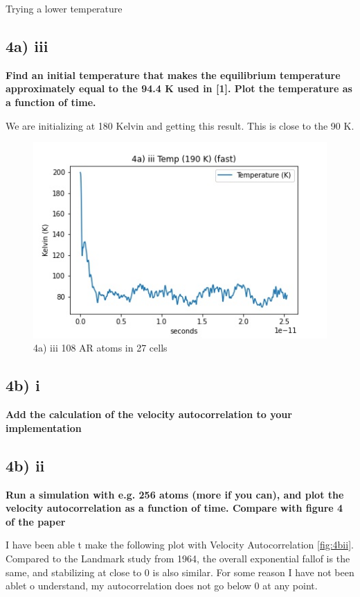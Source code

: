 \documentclass[a4paper,10pt,english]{article}
\begin{document}
Trying a lower temperature

\subsection*{4a) iii }
\textbf{Find an initial temperature that makes the equilibrium temperature approximately equal to the
94.4 K used in [1]. Plot the temperature as a function of time.
}


We are initializing at 180 Kelvin and getting this result. This is close to the 90 K. 
\begin{figure}[h!]
        \centering 
        \includegraphics[scale=0.6]{./py/img/4a_iii_fast.jpg} 
        \caption{4a) iii 108 AR atoms in 27 cells  }
        \label{fig:3biv}
\end{figure}


\subsection*{4b) i}
\textbf{Add the calculation of the velocity autocorrelation to your implementation}

\newpage
\subsection*{4b) ii}
\textbf{Run a simulation with e.g. 256 atoms (more if you can), and plot the velocity autocorrelation as
a function of time. Compare with figure 4 of the paper}

I have been able t make the following plot with Velocity Autocorrelation \ref{fig:4bii}. Compared to the Landmark study from 1964, the overall exponential fallof is the same, and stabilizing at close to 0 is also similar. For some reason I have not been ablet o understand, my autocorrelation does not go below 0 at any point.
\end{document}
